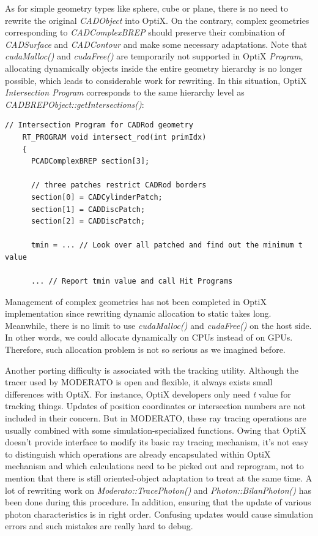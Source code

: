 As for simple geometry types like sphere, cube or plane, there is no need to rewrite the original \textit{CADObject} into OptiX. On the contrary, complex geometries corresponding to \textit{CADComplexBREP} should preserve their combination of \textit{CADSurface} and \textit{CADContour} and make some necessary adaptations. Note that \textit{cudaMalloc()} and \textit{cudaFree()} are temporarily not supported in OptiX \textit{Program}, allocating dynamically objects inside the entire geometry hierarchy is no longer possible, which leads to considerable work for rewriting. In this situation, OptiX \textit{Intersection Program} corresponds to the same hierarchy level as \textit{CADBREPObject::getIntersections()}:
\begin{lstlisting}[mathescape]
    // Intersection Program for CADRod geometry
    RT_PROGRAM void intersect_rod(int primIdx)
    {
      PCADComplexBREP section[3];

      // three patches restrict CADRod borders
      section[0] = CADCylinderPatch;
      section[1] = CADDiscPatch;
      section[2] = CADDiscPatch;

      tmin = ... // Look over all patched and find out the minimum t value

      ... // Report tmin value and call Hit Programs
\end{lstlisting}
Management of complex geometries has not been completed in OptiX implementation since rewriting dynamic allocation to static takes long. Meanwhile, there is no limit to use \textit{cudaMalloc()} and \textit{cudaFree()} on the host side. In other words, we could allocate dynamically on CPUs instead of on GPUs. Therefore, such allocation problem is not so serious as we imagined before.

Another porting difficulty is associated with the tracking utility. Although the tracer used by MODERATO is open and flexible, it always exists small differences with OptiX. For instance, OptiX developers only need \textit{t} value for tracking things. Updates of position coordinates or intersection numbers are not included in their concern. But in MODERATO, these ray tracing operations are usually combined with some simulation-specialized functions. Owing that OptiX doesn't provide interface to modify its basic ray tracing mechanism, it's not easy to distinguish which operations are already encapsulated within OptiX mechanism and which calculations need to be picked out and reprogram, not to mention that there is still oriented-object adaptation to treat at the same time. A lot of rewriting work on \textit{Moderato::TracePhoton()} and \textit{Photon::BilanPhoton()} has been done during this procedure. In addition, ensuring that the update of various photon characteristics is in right order. Confusing updates would cause simulation errors and such mistakes are really hard to debug.

